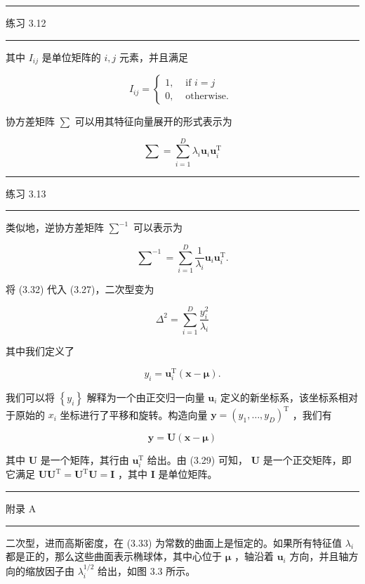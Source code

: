 \documentclass[10pt]{report}
\newcommand{\HRule}{\begin{center}\rule{0.9\linewidth}{0.2mm}\end{center}}
\begin{document}
\HRule

练习 3.12

\HRule

其中 \({I}_{ij}\) 是单位矩阵的 \(i,j\) 元素，并且满足

\[
{I}_{ij} = \left\{  \begin{array}{ll} 1, & \text{ if }i = j \\  0, & \text{ otherwise. } \end{array}\right.  \tag{3.30}
\]

协方差矩阵 \(\mathbf{\sum }\) 可以用其特征向量展开的形式表示为

\[
\mathbf{\sum } = \mathop{\sum }\limits_{{i = 1}}^{D}{\lambda }_{i}{\mathbf{u}}_{i}{\mathbf{u}}_{i}^{\mathrm{T}} \tag{3.31}
\]

\HRule

练习 3.13

\HRule

类似地，逆协方差矩阵 \({\mathbf{\sum }}^{-1}\) 可以表示为

\[
{\mathbf{\sum }}^{-1} = \mathop{\sum }\limits_{{i = 1}}^{D}\frac{1}{{\lambda }_{i}}{\mathbf{u}}_{i}{\mathbf{u}}_{i}^{\mathrm{T}}. \tag{3.32}
\]

将 (3.32) 代入 (3.27)，二次型变为

\[
{\Delta }^{2} = \mathop{\sum }\limits_{{i = 1}}^{D}\frac{{y}_{i}^{2}}{{\lambda }_{i}} \tag{3.33}
\]

其中我们定义了

\[
{y}_{i} = {\mathbf{u}}_{i}^{\mathrm{T}}\left( {\mathbf{x} - \mathbf{\mu }}\right) . \tag{3.34}
\]

我们可以将 \(\left\{  {y}_{i}\right\}\) 解释为一个由正交归一向量 \({\mathbf{u}}_{i}\) 定义的新坐标系，该坐标系相对于原始的 \({x}_{i}\) 坐标进行了平移和旋转。构造向量 \(\mathbf{y} = {\left( {y}_{1},\ldots ,{y}_{D}\right) }^{\mathrm{T}}\) ，我们有

\[
\mathbf{y} = \mathbf{U}\left( {\mathbf{x} - \mathbf{\mu }}\right)  \tag{3.35}
\]

其中 \(\mathbf{U}\) 是一个矩阵，其行由 \({\mathbf{u}}_{i}^{\mathrm{T}}\) 给出。由 (3.29) 可知， \(\mathbf{U}\) 是一个正交矩阵，即它满足 \(\mathbf{U}{\mathbf{U}}^{\mathrm{T}} = {\mathbf{U}}^{\mathrm{T}}\mathbf{U} = \mathbf{I}\) ，其中 \(\mathbf{I}\) 是单位矩阵。

\HRule

附录 A

\HRule

二次型，进而高斯密度，在 (3.33) 为常数的曲面上是恒定的。如果所有特征值 \({\lambda }_{i}\) 都是正的，那么这些曲面表示椭球体，其中心位于 \(\mathbf{\mu }\) ，轴沿着 \({\mathbf{u}}_{i}\) 方向，并且轴方向的缩放因子由 \({\lambda }_{i}^{1/2}\) 给出，如图 3.3 所示。
\end{document}
